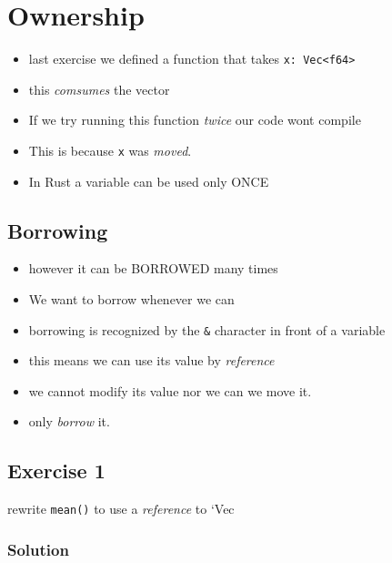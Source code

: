 \documentclass[
  letterpaper,
  DIV=11,
  numbers=noendperiod,
  oneside]{scrreprt}
\providecommand{\tightlist}{%
  \setlength{\itemsep}{0pt}\setlength{\parskip}{0pt}}\usepackage{longtable,booktabs,array}
\begin{document}
\chapter{Ownership}\label{ownership}

\begin{itemize}
\tightlist
\item
  last exercise we defined a function that takes
  \texttt{x:\ Vec\textless{}f64\textgreater{}}
\item
  this \emph{comsumes} the vector
\item
  If we try running this function \emph{twice} our code wont compile
\item
  This is because \texttt{x} was \emph{moved}.
\item
  In Rust a variable can be used only ONCE
\end{itemize}

\section{Borrowing}\label{borrowing}

\begin{itemize}
\tightlist
\item
  however it can be BORROWED many times
\item
  We want to borrow whenever we can
\item
  borrowing is recognized by the \texttt{\&} character in front of a
  variable
\item
  this means we can use its value by \emph{reference}
\item
  we cannot modify its value nor we can we move it.
\item
  only \emph{borrow} it.
\end{itemize}

\section{Exercise 1}\label{exercise-1-1}

rewrite \texttt{mean()} to use a \emph{reference} to `Vec

\subsection{Solution}\label{solution-7}
\end{document}
